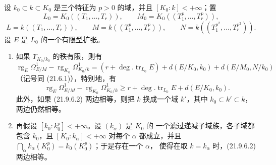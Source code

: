 \begin{proposition}[21.9.6]
\label{0.21.9.6-fr}
设 $k_0\subset k\subset K_0$ 是三个特征为 $p>0$ 的域，并且
$[K_0:k]<+\infty$；置
\[
  L_0=K_0((T_1,\ldots,T_r)),\qquad
  M_0=K_0((T_1^p,\ldots,T_r^p)),
\]
\[
  L=k((T_1,\ldots,T_r)),\qquad
  M=k((T_1^p,\ldots,T_r^p)),\qquad
  N=k((T_1^{p^2},\ldots,T_r^{p^2})).
\]
设 $E$ 是 $L_0$ 的一个有限型扩张。
\begin{enumerate}
  \item[(i)] 如果 $\Upsilon_{K_0/k_0}$ 的秩有限，则有
  \begin{equation}
  \tag{21.9.6.1}
  \label{0.21.9.6.1-fr}
    \operatorname{rg}_E\Omega^1_{E/M}
    -\operatorname{rg}_{K_0}\Omega^1_{K_0/k}
    =(r+\deg.\operatorname{tr}_{L_0}E)
      +d(E/K_0,k_0)+d(E/M_0,N/k_0)
  \end{equation}
  （记号同 (21.6.1)），特别地，有
  \begin{equation}
  \tag{21.9.6.2}
  \label{0.21.9.6.2-fr}
    \operatorname{rg}_E\Omega^1_{E/M}
    -\operatorname{rg}_{K_0}\Omega^1_{K_0/k}
    \geqslant r+\deg.\operatorname{tr}_{L_0}E+d(E/K_0,k_0).
  \end{equation}
  此外，如果 (21.9.6.2) 两边相等，则把 $k$ 换成一个域 $k'$，其中
  $k_0\subset k'\subset k$，两边仍然相等。

  \item[(ii)] 再假设 $[k_0:k_0^p]<+\infty$。设 $(k_\alpha)$ 是 $K_0$ 的
  一个滤过递减子域族，各子域都包含 $k_0$，且
  $[K_0:k_\alpha]<+\infty$ 对每个 $\alpha$ 都成立，并且
  $\bigcap_\alpha k_\alpha(K_0^p)=k_0(K_0^p)$；于是存在一个 $\alpha$，
  使得在取 $k=k_\alpha$ 时，(21.9.6.2) 两边相等。
\end{enumerate}
\end{proposition}

